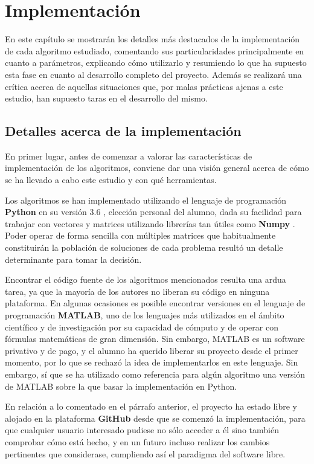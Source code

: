 \chapter{Implementación}

En este capítulo se mostrarán los detalles más destacados de la implementación de cada algoritmo estudiado, comentando sus particularidades principalmente en cuanto a parámetros, explicando cómo utilizarlo y resumiendo lo que ha supuesto esta fase en cuanto al desarrollo completo del proyecto. Además se realizará una crítica acerca de aquellas situaciones que, por malas prácticas ajenas a este estudio, han supuesto taras en el desarrollo del mismo.

\section{Detalles acerca de la implementación}

En primer lugar, antes de comenzar a valorar las características de implementación de los algoritmos, conviene dar una visión general acerca de cómo se ha llevado a cabo este estudio y con qué herramientas.

Los algoritmos se han implementado utilizando el lenguaje de programación \textbf{Python} en su versión 3.6 \cite{python-3.6-doc}, elección personal del alumno, dada su facilidad para trabajar con vectores y matrices utilizando librerías tan útiles como \textbf{Numpy} \cite{numpy-doc}. Poder operar de forma sencilla con múltiples matrices que habitualmente constituirán la población de soluciones de cada problema resultó un detalle determinante para tomar la decisión.

Encontrar el código fuente de los algoritmos mencionados resulta una ardua tarea, ya que la mayoría de los autores no liberan su código en ninguna plataforma. En algunas ocasiones es posible encontrar versiones en el lenguaje de programación \textbf{MATLAB}, uno de los lenguajes más utilizados en el ámbito científico y de investigación por su capacidad de cómputo y de operar con fórmulas matemáticas de gran dimensión. Sin embargo, MATLAB es un software privativo y de pago, y el alumno ha querido liberar su proyecto desde el primer momento, por lo que se rechazó la idea de implementarlos en este lenguaje. Sin embargo, sí que se ha utilizado como referencia para algún algoritmo una versión de MATLAB sobre la que basar la implementación en Python.

En relación a lo comentado en el párrafo anterior, el proyecto ha estado libre y alojado en la plataforma \textbf{GitHub} \cite{repositorio-tfg} desde que se comenzó la implementación, para que cualquier usuario interesado pudiese no sólo acceder a él sino también comprobar cómo está hecho, y en un futuro incluso realizar los cambios pertinentes que considerase, cumpliendo así el paradigma del software libre.

